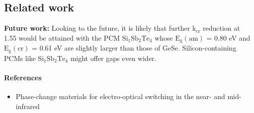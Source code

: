 \documentclass[]{article}
\providecommand{\tightlist}{%
  \setlength{\itemsep}{0pt}\setlength{\parskip}{0pt}}
\let\oldparagraph\paragraph
\renewcommand{\paragraph}[1]{\oldparagraph{#1}\mbox{}}
\begin{document}
\subsection{Related work}\label{related-work}

\textbf{Future work:} Looking to the future, it is likely that further $\mathrm{k_{cr}}$
reduction at 1.55  would be attained with the PCM \(\mathrm{Si_1 Sb_2 Te_4}\)
whose \(\mathrm{E_g(am)}\) = 0.80 eV and \(\mathrm{E_g(cr)}\) = 0.61 eV
are slightly larger than those of GeSe. Silicon-containing PCMs like
\(\mathrm{Si_1 Sb_2 Te_4}\) might offer gaps even wider.

\paragraph{References}\label{references}

\begin{itemize}
\tightlist
\item
  Phase-change materials for electro-optical switching in the near- and
  mid-infrared
\end{itemize}
\end{document}
